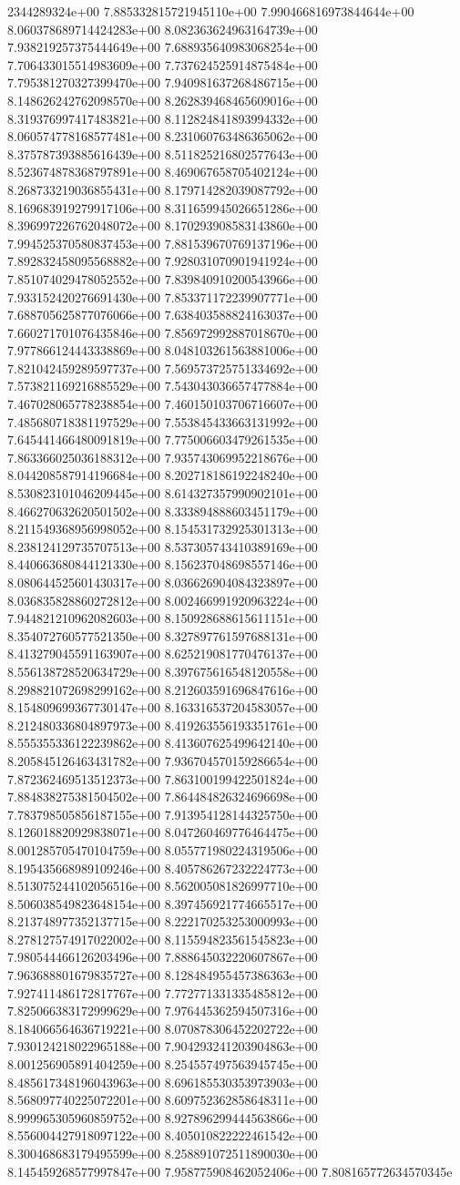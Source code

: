 2344289324e+00	7.885332815721945110e+00	7.990466816973844644e+00	8.060378689714424283e+00	8.082363624963164739e+00	7.938219257375444649e+00	7.688935640983068254e+00	7.706433015514983609e+00	7.737624525914875484e+00	7.795381270327399470e+00	7.940981637268486715e+00	8.148626242762098570e+00	8.262839468465609016e+00	8.319376997417483821e+00	8.112824841893994332e+00	8.060574778168577481e+00	8.231060763486365062e+00	8.375787393885616439e+00	8.511825216802577643e+00	8.523674878368797891e+00	8.469067658705402124e+00	8.268733219036855431e+00	8.179714282039087792e+00	8.169683919279917106e+00	8.311659945026651286e+00	8.396997226762048072e+00	8.170293908583143860e+00	7.994525370580837453e+00	7.881539670769137196e+00	7.892832458095568882e+00	7.928031070901941924e+00	7.851074029478052552e+00	7.839840910200543966e+00	7.933152420276691430e+00	7.853371172239907771e+00	7.688705625877076066e+00	7.638403588824163037e+00	7.660271701076435846e+00	7.856972992887018670e+00	7.977866124443338869e+00	8.048103261563881006e+00	7.821042459289597737e+00	7.569573725751334692e+00	7.573821169216885529e+00	7.543043036657477884e+00	7.467028065778238854e+00	7.460150103706716607e+00	7.485680718381197529e+00	7.553845433663131992e+00	7.645441466480091819e+00	7.775006603479261535e+00	7.863366025036188312e+00	7.935743069952218676e+00	8.044208587914196684e+00	8.202718186192248240e+00	8.530823101046209445e+00	8.614327357990902101e+00	8.466270632620501502e+00	8.333894888603451179e+00	8.211549368956998052e+00	8.154531732925301313e+00	8.238124129735707513e+00	8.537305743410389169e+00	8.440663680844121330e+00	8.156237048698557146e+00	8.080644525601430317e+00	8.036626904084323897e+00	8.036835828860272812e+00	8.002466991920963224e+00	7.944821210962082603e+00	8.150928688615611151e+00	8.354072760577521350e+00	8.327897761597688131e+00	8.413279045591163907e+00	8.625219081770476137e+00	8.556138728520634729e+00	8.397675616548120558e+00	8.298821072698299162e+00	8.212603591696847616e+00	8.154809699367730147e+00	8.163316537204583057e+00	8.212480336804897973e+00	8.419263556193351761e+00	8.555355336122239862e+00	8.413607625499642140e+00	8.205845126463431782e+00	7.936704570159286654e+00	7.872362469513512373e+00	7.863100199422501824e+00	7.884838275381504502e+00	7.864484826324696698e+00	7.783798505856187155e+00	7.913954128144325750e+00	8.126018820929838071e+00	8.047260469776464475e+00	8.001285705470104759e+00	8.055771980224319506e+00	8.195435668989109246e+00	8.405786267232224773e+00	8.513075244102056516e+00	8.562005081826997710e+00	8.506038549823648154e+00	8.397456921774665517e+00	8.213748977352137715e+00	8.222170253253000993e+00	8.278127574917022002e+00	8.115594823561545823e+00	7.980544466126203496e+00	7.888645032220607867e+00	7.963688801679835727e+00	8.128484955457386363e+00	7.927411486172817767e+00	7.772771331335485812e+00	7.825066383172999629e+00	7.976445362594507316e+00	8.184066564636719221e+00	8.070878306452202722e+00	7.930124218022965188e+00	7.904293241203904863e+00	8.001256905891404259e+00	8.254557497563945745e+00	8.485617348196043963e+00	8.696185530353973903e+00	8.568097740225072201e+00	8.609752362858648311e+00	8.999965305960859752e+00	8.927896299444563866e+00	8.556004427918097122e+00	8.405010822222461542e+00	8.300468683179495599e+00	8.258891072511890030e+00	8.145459268577997847e+00	7.958775908462052406e+00	7.808165772634570345e